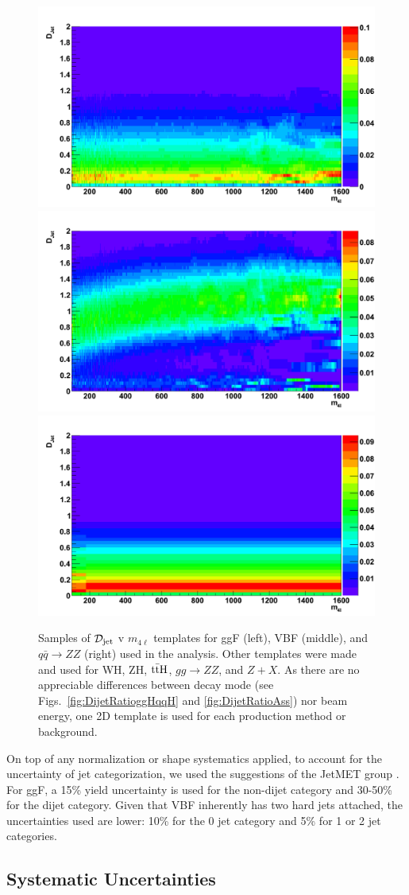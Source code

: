 \begin{figure}[htbp]
\begin{center}
\includegraphics[width=.3\linewidth]{HiggsDiscovery/figures/ggH_Fisher_2D.png}
\includegraphics[width=.3\linewidth]{HiggsDiscovery/figures/qqH_Fisher_2D.png}
\includegraphics[width=.3\linewidth]{HiggsDiscovery/figures/qqZZ_Fisher_2D.png} \\
\caption[Templates of $D_jet$ for Signals and Background]{Samples of $\mathcal{D}_{\rm jet}$ v $m_{4\ell}$ templates for ggF (left), VBF (middle), and $q\bar{q}\rightarrow ZZ$ (right) used in the analysis. Other templates were made and used for WH, ZH, $\rm{t\bar{t}H}$, $gg\rightarrow ZZ$, and $Z+X$. As there are no appreciable differences between decay mode (see Figs.~\ref{fig:DijetRatioggHqqH} and \ref{fig:DijetRatioAss}) nor beam energy, one 2D template is used for each production method or background.}
\label{fig:FisherTemplates}
\end{center}
\end{figure}

On top of any normalization or shape systematics applied, to account for the uncertainty of jet categorization, we used the suggestions of the JetMET group \cite{Chatrchyan:2014nva}. For ggF, a 15\% yield uncertainty is used for the non-dijet category and 30-50\% for the dijet category. Given that VBF inherently has two hard jets attached, the uncertainties used are lower: 10\% for the 0 jet category and 5\% for 1 or 2 jet categories.

\subsection{Systematic Uncertainties}
\label{sec:ZZ4lSystematics}

